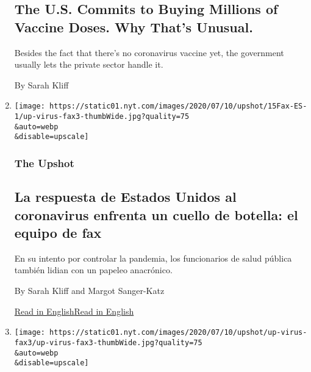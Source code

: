 \begin{enumerate}
  \hypertarget{the-us-commits-to-buying-millions-of-vaccine-doses-why-thats-unusual}{%
  \subsection{The U.S. Commits to Buying Millions of Vaccine Doses. Why
  That's
  Unusual.}\label{the-us-commits-to-buying-millions-of-vaccine-doses-why-thats-unusual}}

  Besides the fact that there's no coronavirus vaccine yet, the
  government usually lets the private sector handle it.

  By Sarah Kliff
\item
  \href{/es/2020/07/15/espanol/mundo/coronavirus-sistema-salud-publica.html}{}

  \texttt{[image: https://static01.nyt.com/images/2020/07/10/upshot/15Fax-ES-1/up-virus-fax3-thumbWide.jpg?quality=75\\\&auto=webp\\\&disable=upscale]}

  \hypertarget{the-upshot}{%
  \subsubsection{The Upshot}\label{the-upshot}}

  \hypertarget{la-respuesta-de-estados-unidos-al-coronavirus-enfrenta-un-cuello-de-botella-el-equipo-de-fax}{%
  \subsection{La respuesta de Estados Unidos al coronavirus enfrenta un
  cuello de botella: el equipo de
  fax}\label{la-respuesta-de-estados-unidos-al-coronavirus-enfrenta-un-cuello-de-botella-el-equipo-de-fax}}

  En su intento por controlar la pandemia, los funcionarios de salud
  pública también lidian con un papeleo anacrónico.

  By Sarah Kliff and Margot Sanger-Katz

  \href{https://www.nytimes.com/2020/07/13/upshot/coronavirus-response-fax-machines.html}{Read
  in
  English}\href{https://www.nytimes.com/2020/07/13/upshot/coronavirus-response-fax-machines.html}{Read
  in English}
\item
  \href{/2020/07/13/upshot/coronavirus-response-fax-machines.html}{}

  \texttt{[image: https://static01.nyt.com/images/2020/07/10/upshot/up-virus-fax3/up-virus-fax3-thumbWide.jpg?quality=75\\\&auto=webp\\\&disable=upscale]}


\end{enumerate}
